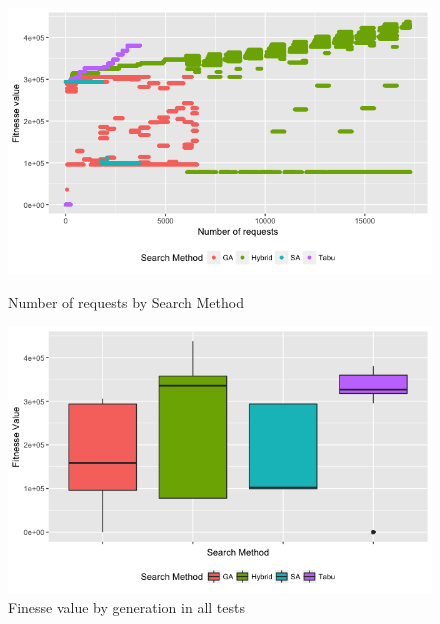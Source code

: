 \documentclass[times]{stvrauth}
\begin{document}
\begin{figure}[h]
\begin{minipage}{.5\textwidth}
\centering
\includegraphics[width=1\textwidth]{./images/experiment2-1.png}
\caption{Number of requests by Search Method}
\label{fig:numberofrequestsbysearchmethod2}
\end{minipage}
\begin{minipage}{.5\textwidth}
\centering
\includegraphics[width=1\textwidth]{./images/experiment2-2.png}
\caption{Finesse value by generation in all tests}
\label{fig:boxplot2}
\end{minipage}

\end{figure}
\end{document}

